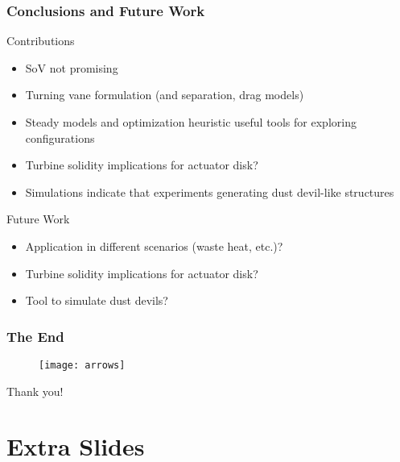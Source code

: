 \documentclass[mathserif]{beamer}
\begin{document}
%
%
\begin{frame}
 \frametitle{Conclusions and Future Work}

 \begin{block}{Contributions}
  \begin{itemize}
  \item SoV not promising
  \item Turning vane formulation (and separation, drag models)
  \item Steady models and optimization heuristic useful tools for exploring configurations
  \item Turbine solidity implications for actuator disk?
  \item Simulations indicate that experiments generating dust devil-like structures
  \end{itemize}
 \end{block}


 \begin{block}{Future Work}
  \begin{itemize}
  \item Application in different scenarios (waste heat, etc.)?
  \item Turbine solidity implications for actuator disk?
  \item Tool to simulate dust devils?
  \end{itemize}
 \end{block}
 


\end{frame}

%
%
%
 \begin{frame}
   \frametitle{The End}

   \begin{figure}[htb]
     \centering
     \texttt{[image: arrows]}
   \end{figure}

   \begin{block}{Thank you!}
    \end{block}
 \end{frame}


%
\appendix
\section{Extra Slides}
\end{document}
